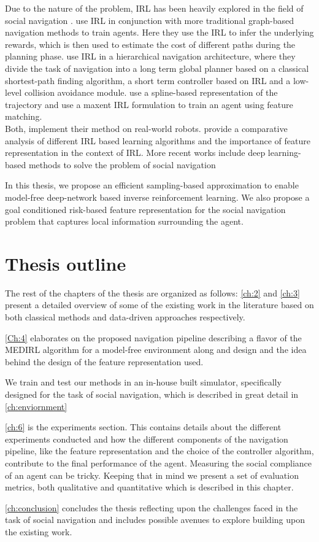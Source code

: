 Due to the nature of the problem, IRL has been heavily explored in the field of social navigation \cite{kuderer_socially_nodate, kretzschmar_socially_2016}. \cite{shiarlis_rapidly_2017, okal_efcient_nodate} use IRL in conjunction with more traditional graph-based navigation methods to train agents. Here they use the IRL to infer the underlying rewards, which is then used to estimate the cost of different paths during the planning phase. \cite{kim_socially_2016} use IRL in a hierarchical navigation architecture, where they divide the task of navigation into a long term global planner based on a classical shortest-path finding algorithm, a short term controller based on IRL and a low-level collision avoidance module. \cite{kretzschmar_socially_2016} use a spline-based representation of the trajectory and use a maxent IRL formulation to train an agent using feature matching. 
\\
Both,\cite{kim_socially_2016, kretzschmar_socially_2016} implement their method on real-world robots. \cite{vasquez_inverse_2014} provide a comparative analysis of different IRL based learning algorithms and the importance of feature representation in the context of IRL. More recent works include deep learning-based methods to solve the problem of social navigation \cite{fahad_learning_2018, wulfmeier2015maximum}


In this thesis, we propose an efficient sampling-based approximation to enable model-free deep-network based inverse reinforcement learning. We also propose a goal conditioned risk-based feature representation for the social navigation problem that captures local information surrounding the agent. 

\section{Thesis outline}
The rest of the chapters of the thesis are organized as follows:
\autoref{ch:2} and \autoref{ch:3} present a detailed overview of some of the existing work in the literature based on both classical methods and data-driven approaches respectively.

\autoref{Ch:4} elaborates on the proposed navigation pipeline describing a flavor of the MEDIRL algorithm for a model-free environment along and design and the idea behind the design of the feature representation used.

We train and test our methods in an in-house built simulator, specifically designed for the task of social navigation, which is described in great detail in \autoref{ch:enviornment}

\autoref{ch:6} is the experiments section. This contains details about the different experiments conducted and how the different components of the navigation pipeline, like the feature representation and the choice of the controller algorithm, contribute to the final performance of the agent. Measuring the social compliance of an agent can be tricky. Keeping that in mind we present a set of evaluation metrics, both qualitative and quantitative which is described in this chapter.

\autoref{ch:conclusion} concludes the thesis reflecting upon the challenges faced in the task of social navigation and includes possible avenues to explore building upon the existing work.
